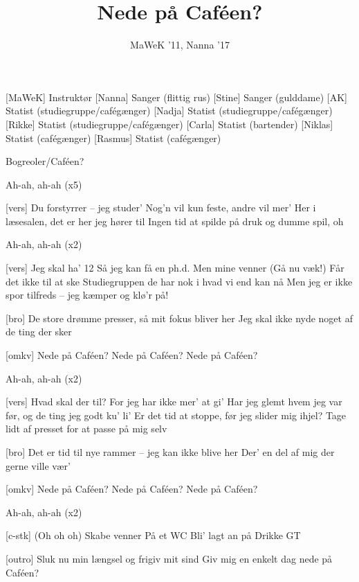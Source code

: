 \documentclass[a4paper,11pt]{article}
\title{Nede på Caféen?}
\author{MaWeK '11, Nanna '17}
\begin{document}
\maketitle

\begin{roles}
[MaWeK] Instruktør
[Nanna] Sanger (flittig rus)
[Stine] Sanger (gulddame)
[AK] Statist (studiegruppe/cafégænger)
[Nadja] Statist (studiegruppe/cafégænger)
[Rikke] Statist (studiegruppe/cafégænger)
[Carla] Statist (bartender)
[Niklas] Statist (cafégænger)
[Rasmus] Statist (cafégænger)
\end{roles}

\begin{props}
 Bogreoler/Caféen?
\end{props}


\begin{song}
%
Ah-ah, ah-ah (x5)

[vers]%
Du forstyrrer -- jeg studer'
Nog'n vil kun feste, andre vil mer'
Her i læsesalen, det er her jeg hører til
Ingen tid at spilde på druk og dumme spil, oh

%
Ah-ah, ah-ah (x2)

[vers]%
Jeg skal ha' 12
Så jeg kan få en ph.d.
Men mine venner (Gå nu væk!)
Får det ikke til at ske
Studiegruppen de har nok i hvad vi end kan nå
Men jeg er ikke spor tilfreds -- jeg kæmper og klø'r på!

[bro]%
De store drømme presser, så mit fokus bliver her
Jeg skal ikke nyde noget af de ting der sker 

[omkv]%
Nede på Caféen?
Nede på Caféen?
Nede på Caféen?

%
Ah-ah, ah-ah (x2)

[vers]%
Hvad skal der til?
For jeg har ikke mer' at gi'
Har jeg glemt hvem jeg var før, og de ting jeg godt ku' li'
Er det tid at stoppe, før jeg slider mig ihjel?
Tage lidt af presset for at passe på mig selv

[bro]%
Det er tid til nye rammer -- jeg kan ikke blive her
Der' en del af mig der gerne ville vær'

[omkv]%
Nede på Caféen?
Nede på Caféen?
Nede på Caféen?

%
Ah-ah, ah-ah (x2)

[c-stk]%
(Oh oh oh)
Skabe venner
På et WC
Bli' lagt an på
Drikke GT

[outro]%
Sluk nu min længsel og frigiv mit sind
Giv mig en enkelt dag nede på Caféen?
\end{song}
\end{document}

